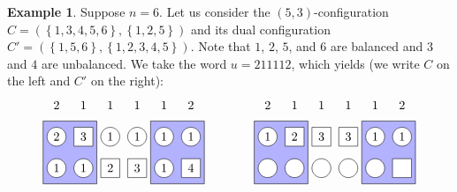 \documentclass[reqno]{amsart}
\newcommand{\0}{\phantom{c}}
\newcommand{\set}[1]{\left\{ #1 \right\}}
\theoremstyle{plain}
\theoremstyle{definition}
\newtheorem{example}[thm]{Example}
\numberwithin{equation}{section}
\begin{document}
\begin{example}
\label{ex:proof_process}
Suppose $n = 6$.
Let us consider the $(5,3)$-configuration $C = (\set{1,3,4,5,6}, \set{1,2,5})$ and its dual configuration $C' = (\set{1,5,6}, \set{1,2,3,4,5})$.
Note that $1$, $2$, $5$, and $6$ are balanced and $3$ and $4$ are unbalanced.
We take the word $u = 211112$, which yields (we write $C$ on the left and $C'$ on the right):
\[
\begin{tikzpicture}[scale=0.9]
  \def\sc{0.85}   %
  \def\lll{3}  %
  \def\ll{2}   %
  \def\l{1}   %
  \draw[fill=blue!30] (0.5*\sc,\l-.5) rectangle(2.5*\sc,\ll+.5);
  \draw[fill=blue!30] (4.5*\sc,\l-.5) rectangle(6.5*\sc,\ll+.5);
  \foreach \i in {1,3,4,5,6} { \draw[fill=white] (\i*\sc,\ll) circle (0.3); }
  \foreach \i in {2} { \draw[fill=white] (\i*\sc-.3,\ll-.3) rectangle +(0.6,+0.6); }
  \foreach \i in {1,2,5} { \draw[fill=white] (\i*\sc,\l) circle (0.3); }
  \foreach \i in {3,4,6} { \draw[fill=white] (\i*\sc-.3,\l-.3) rectangle +(0.6,+0.6); }
  \foreach \i in {2,3,4,5} { \node at (\i*\sc,\lll) {$1$}; }
  \foreach \i in {1,6} { \node at (\i*\sc,\lll) {$2$}; }
  \foreach \i in {3,4,5,6} { \node at (\i*\sc,\ll) {$1$}; }
  \foreach \i in {1} { \node at (\i*\sc,\ll) {$2$}; }
  \foreach \i in {2} { \node at (\i*\sc,\ll) {$3$}; }
  \foreach \i in {1,2,5} { \node at (\i*\sc,\l) {$1$}; }
  \foreach \i in {3} { \node at (\i*\sc,\l) {$2$}; }
  \foreach \i in {4} { \node at (\i*\sc,\l) {$3$}; }
  \foreach \i in {6} { \node at (\i*\sc,\l) {$4$}; }
\end{tikzpicture}
\hspace{40pt}
\begin{tikzpicture}[scale=0.9]
  \def\sc{0.85}   %
  \def\lll{3}  %
  \def\ll{2}   %
  \def\l{1}   %
  \draw[fill=blue!30] (0.5*\sc,\l-.5) rectangle(2.5*\sc,\ll+.5);
  \draw[fill=blue!30] (4.5*\sc,\l-.5) rectangle(6.5*\sc,\ll+.5);
  \foreach \i in {1,5,6} { \draw[fill=white] (\i*\sc,\ll) circle (0.3); }
  \foreach \i in {2,3,4} { \draw[fill=white] (\i*\sc-.3,\ll-.3) rectangle +(0.6,+0.6); }
  \foreach \i in {1,2,3,4,5} { \draw[fill=white] (\i*\sc,\l) circle (0.3); }
  \foreach \i in {6} { \draw[fill=white] (\i*\sc-.3,\l-.3) rectangle +(0.6,+0.6); }
  \foreach \i in {2,3,4,5} { \node at (\i*\sc,\lll) {$1$}; }
  \foreach \i in {1,6} { \node at (\i*\sc,\lll) {$2$}; }
  \foreach \i in {1,5,6} { \node at (\i*\sc,\ll) {$1$}; }
  \foreach \i in {2} { \node at (\i*\sc,\ll) {$2$}; }
  \foreach \i in {3,4} { \node at (\i*\sc,\ll) {$3$}; }

\end{tikzpicture}\]
\end{example}
\end{document}
